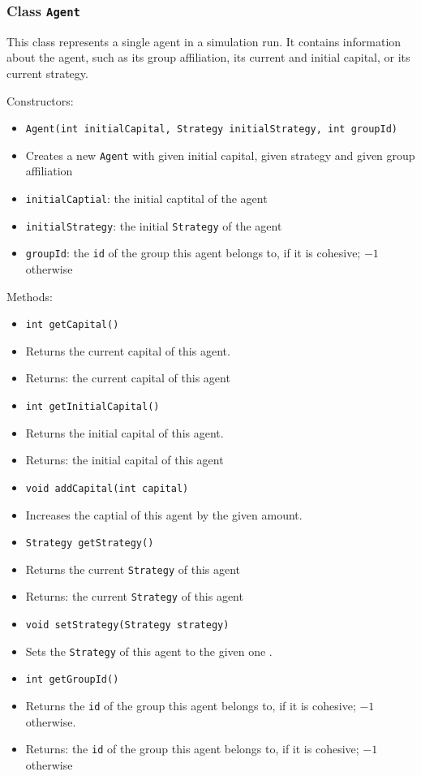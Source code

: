 \documentclass[parskip=full,11pt]{scrartcl}
\begin{document}
\subsubsection{Class \texttt{Agent}}
This class represents a single agent in a simulation run. It contains information about the agent, such as its group affiliation, its current and initial capital, or its current strategy.

Constructors:
\begin{itemize}\itemsep -10pt
\item \texttt{Agent(int initialCapital, Strategy initialStrategy, int groupId)}
\item[] Creates a new \texttt{Agent} with given initial capital, given strategy and given group affiliation
\item[] \texttt{initialCaptial}: the initial captital of the agent
\item[] \texttt{initialStrategy}: the initial \texttt{Strategy} of the agent
\item[] \texttt{groupId}: the \texttt{id} of the group this agent belongs to, if it is cohesive; \(-1\) otherwise
\end{itemize}

Methods:
\begin{itemize}\itemsep -10pt
\item \texttt{int getCapital()}
\item[] Returns the current capital of this agent.
\item[] Returns: the current capital of this agent

\item \texttt{int getInitialCapital()}
\item[] Returns the initial capital of this agent.
\item[] Returns: the initial capital of this agent

\item \texttt{void addCapital(int capital)}
\item[] Increases the captial of this agent by the given amount.

\item \texttt{Strategy getStrategy()}
\item[] Returns the current \texttt{Strategy} of this agent
\item[] Returns: the current \texttt{Strategy} of this agent

\item\texttt{void setStrategy(Strategy strategy)}
\item[] Sets the \texttt{Strategy} of this agent to the given one	.

\item \texttt{int getGroupId()}
\item[] Returns the \texttt{id} of the group this agent belongs to, if it is cohesive; \(-1\) otherwise.
\item[] Returns: the \texttt{id} of the group this agent belongs to, if it is cohesive; \(-1\) otherwise
\end{itemize}
\end{document}
